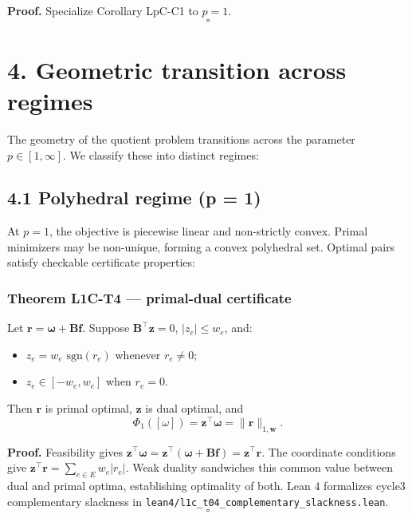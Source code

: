\documentclass[
]{article}
\providecommand{\tightlist}{%
  \setlength{\itemsep}{0pt}\setlength{\parskip}{0pt}}
\providecommand{\tightlist}{%
  \setlength{\itemsep}{0pt}\setlength{\parskip}{0pt}}
\begin{document}
\textbf{Proof.} Specialize Corollary LpC-C1 to \(p = 1\). \[\square\]

\section{4. Geometric transition across regimes}\label{geometric-transition-across-regimes}

The geometry of the quotient problem transitions across the parameter \(p \in [1, \infty]\). We classify these into distinct regimes:

\subsection{4.1 Polyhedral regime (p = 1)}\label{polyhedral-regime-p-1}

At \(p = 1\), the objective is piecewise linear and non-strictly convex. Primal minimizers may be non-unique, forming a convex polyhedral set. Optimal pairs satisfy checkable certificate properties:

\subsubsection{Theorem L1C-T4 --- primal-dual certificate}\label{theorem-l1c-t4-primal-dual-certificate}

Let \(\mathbf{r} = \boldsymbol{\omega} + \mathbf{B}\mathbf{f}\). Suppose \(\mathbf{B}^\top \mathbf{z} = 0\), \(|z_e| \le w_e\), and:

\begin{itemize}
\tightlist
\item
  \(z_e = w_e \text{ sgn}(r_e)\) whenever \(r_e \ne 0\);
\item
  \(z_e \in [-w_e, w_e]\) when \(r_e = 0\).
\end{itemize}

Then \(\mathbf{r}\) is primal optimal, \(\mathbf{z}\) is dual optimal, and
\[\Phi_1([\omega]) = \mathbf{z}^\top \boldsymbol{\omega} = \|\mathbf{r}\|_{1,\mathbf{w}}.\]

\textbf{Proof.} Feasibility gives \(\mathbf{z}^\top \boldsymbol{\omega} = \mathbf{z}^\top (\boldsymbol{\omega} + \mathbf{B}\mathbf{f}) = \mathbf{z}^\top \mathbf{r}\).
The coordinate conditions give \(\mathbf{z}^\top \mathbf{r} = \sum_{e \in E} w_e |r_e|\). Weak duality sandwiches
this common value between dual and primal optima, establishing optimality of both. Lean 4 formalizes cycle3 complementary slackness in \texttt{lean4/l1c\_t04\_complementary\_slackness.lean}. \[\square\]
\end{document}
